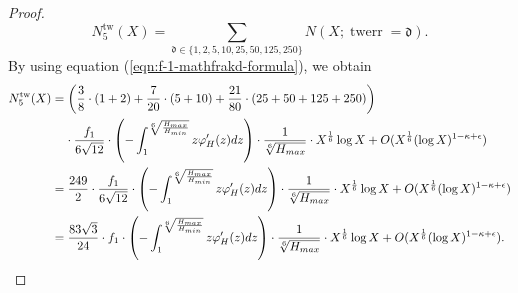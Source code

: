 \documentclass[12pt]{amsart}
\numberwithin{equation}{section} %
\theoremstyle{definition} \newtheorem{definition}[counter]{Definition}
\theoremstyle{remark} \newtheorem{nonexam}[counter]{Non-example}
\let\originalleft\left \let\originalright\right
\renewcommand{\left}{\mathopen{}\mathclose\bgroup\originalleft}
\renewcommand{\right}{\aftergroup\egroup\originalright}
\DeclareMathOperator{\tw}{tw} %
\DeclareMathOperator{\twerr}{twerr} %
\begin{document}
\begin{proof}
\begin{equation*}
        N_5^{\tw}(X) = \sum_{\mathfrak{d} \in \{1,2,5,10,25,50,125,250\}}N(X; \twerr = \mathfrak{d}).
    \end{equation*}
    By using equation (\ref{eqn:f-1-mathfrakd-formula}), we obtain
    \begin{align*}
        N_5^{\tw}(X) &= \left( \frac{3}{8} \cdot (1+2) + \frac{7}{20} \cdot (5 + 10) + \frac{21}{80} \cdot (25+50+125+250) \right) \\
        & \; \; \; \; \cdot \frac{f_{1}}{6\sqrt{12}} \cdot \left(- \int_1^{\sqrt[6]{\frac{H_{max}}{H_{min}}}} z \varphi'_H(z) dz \right) \cdot \frac{1}{\sqrt[6]{H_{max}}} \cdot X^{\frac{1}{6}} \log X + O(X^{\frac{1}{6}} (\log X)^{1 - \kappa + \epsilon}) \\
        &= \frac{249}{2} \cdot \frac{f_{1}}{6\sqrt{12}} \cdot \left(- \int_1^{\sqrt[6]{\frac{H_{max}}{H_{min}}}} z \varphi'_H(z) dz \right) \cdot \frac{1}{\sqrt[6]{H_{max}}} \cdot X^{\frac{1}{6}} \log X + O(X^{\frac{1}{6}} (\log X)^{1 - \kappa + \epsilon}) \\
        &= \frac{83\sqrt{3}}{24} \cdot f_1 \cdot \left(- \int_1^{\sqrt[6]{\frac{H_{max}}{H_{min}}}} z \varphi'_H(z) dz \right) \cdot \frac{1}{\sqrt[6]{H_{max}}} \cdot X^{\frac{1}{6}} \log X + O(X^{\frac{1}{6}} (\log X)^{1 - \kappa + \epsilon}).
    \end{align*}
\end{proof}


\clearpage
{} 
\end{document}
